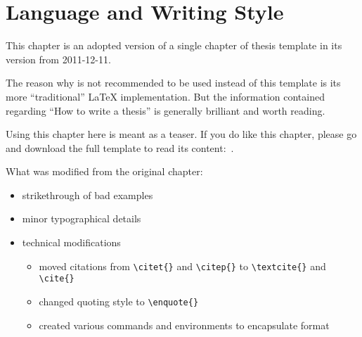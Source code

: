 %
%
% 
% 
% 

\newenvironment{mykeithtabbing}[1]{%
\begin{tabular}{lp{0.9\hsize}}
}{%
\end{tabular}
}

\newcommand{\mybadgood}[2]{%
\begin{mykeithtabbing}
{}\emph{Bad:}  & \sout{#1}  \\
\emph{Good:}   & #2  \\
\end{mykeithtabbing}

}

\chapter{Language and Writing Style}
\label{chap:Style}

\begin{framed}

  This chapter is an adopted version of a single chapter of
  \citeauthor{KeithThesis} thesis template \cite{KeithThesis} in its
  version from 2011-12-11.

  The reason why \cite{KeithThesis} is not recommended to be used instead
  of this template is its more \enquote{traditional} \LaTeX{}
  implementation. But the information contained regarding \enquote{How
    to write a thesis} is generally brilliant and worth reading.

  Using this chapter here is meant as a teaser. If you do like this
  chapter, please go and download the full template to read its
  content:~\cite{KeithThesis}.

  What was modified from the original chapter:
    \begin{itemize}
    \item strikethrough of bad examples
    \item minor typographical details
    \item technical modifications
      \begin{itemize}
      \item moved citations from \verb+\citet{}+ and
        \verb+\citep{}+ to \verb+\textcite{}+ and \verb+\cite{}+
      \item changed quoting style to \verb+\enquote{}+
      \item created various commands and environments to encapsulate
        format
      \end{itemize}
    \end{itemize}
\end{framed}

